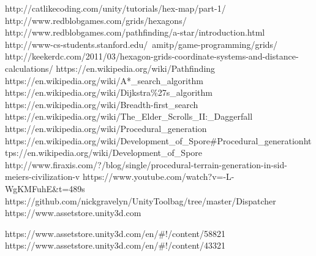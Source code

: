 \begin{thebibliography}{x}
 http://catlikecoding.com/unity/tutorials/hex-map/part-1/
 http://www.redblobgames.com/grids/hexagons/
 http://www.redblobgames.com/pathfinding/a-star/introduction.html
 http://www-cs-students.stanford.edu/~amitp/game-programming/grids/
 http://keekerdc.com/2011/03/hexagon-grids-coordinate-systems-and-distance-calculations/
 https://en.wikipedia.org/wiki/Pathfinding
 https://en.wikipedia.org/wiki/A*\_search\_algorithm
 https://en.wikipedia.org/wiki/Dijkstra\%27s\_algorithm
 https://en.wikipedia.org/wiki/Breadth-first\_search
 https://en.wikipedia.org/wiki/The\_Elder\_Scrolls\_II:\_Daggerfall
 https://en.wikipedia.org/wiki/Procedural\_generation
 https://en.wikipedia.org/wiki/Development\_of\_Spore\#Procedural\_generationhttps://en.wikipedia.org/wiki/Development\_of\_Spore
 http://www.firaxis.com/?/blog/single/procedural-terrain-generation-in-sid-meiers-civilization-v
 https://www.youtube.com/watch?v=-L-WgKMFuhE\&t=489s
 https://github.com/nickgravelyn/UnityToolbag/tree/master/Dispatcher
 https://www.assetstore.unity3d.com

 https://www.assetstore.unity3d.com/en/\#!/content/58821
 https://www.assetstore.unity3d.com/en/\#!/content/43321
\end{thebibliography}
